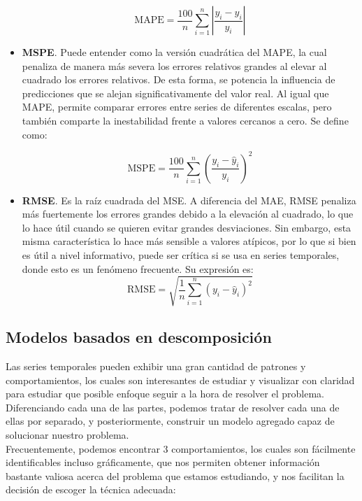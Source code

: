 \begin{itemize}
	$$
	\mathrm{MAPE} = \frac{100}{n} \sum_{i=1}^n \left| \frac{y_i - \hat{y}_i}{y_i} \right|
	$$
	
	
	\item \textbf{MSPE}. Puede entender como la versión cuadrática del MAPE, la cual penaliza de manera más severa los errores relativos grandes al elevar al cuadrado los errores relativos. De esta forma, se potencia la influencia de predicciones que se alejan significativamente del valor real. Al igual que MAPE, permite comparar errores entre series de diferentes escalas, pero también comparte la inestabilidad frente a valores cercanos a cero. Se define como:
	
	$$
	\mathrm{MSPE} = \frac{100}{n} \sum_{i=1}^n \left( \frac{y_i - \hat{y}_i}{y_i} \right)^2
	$$
	
	\item \textbf{RMSE}. Es la raíz cuadrada del MSE. A diferencia del MAE, RMSE penaliza más fuertemente los errores grandes debido a la elevación al cuadrado, lo que lo hace útil cuando se quieren evitar grandes desviaciones. Sin embargo, esta misma característica lo hace más sensible a valores atípicos, por lo que si bien es útil a nivel informativo, puede ser crítica si se usa en series temporales, donde esto es un fenómeno frecuente. Su expresión es:
	$$
	\mathrm{RMSE} = \sqrt{\frac{1}{n} \sum_{i=1}^n (y_i - \hat{y}_i)^2}
	$$
\end{itemize}

\subsection{Modelos basados en descomposición}

Las series temporales pueden exhibir una gran cantidad de patrones y comportamientos, los cuales son interesantes de estudiar y visualizar con claridad para estudiar que posible enfoque seguir a la hora de resolver el problema. Diferenciando cada una de las partes, podemos tratar de resolver cada una de ellas por separado, y posteriormente, construir un modelo agregado capaz de solucionar nuestro problema.\\

Frecuentemente, podemos encontrar 3 comportamientos, los cuales son fácilmente identificables incluso gráficamente, que nos permiten obtener información bastante valiosa acerca del problema que estamos estudiando, y nos facilitan la decisión de escoger la técnica adecuada:

